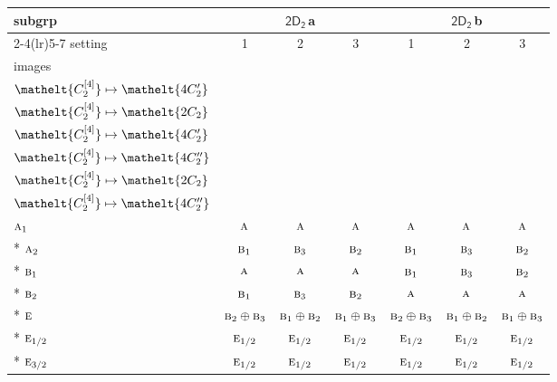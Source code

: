 \documentclass[10pt,a4paper]{article}
\numberwithin{equation}{section}
\newcommand{\eltfont}[1]{{\let\sigma\eltsigma\mathelt{#1}}}
\newcommand{\grp}[1]{\mathsf{#1}}
\newcommand{\irr}[1]{\text{\normalfont\scshape #1}}
\newcommand{\cls}[1]{\eltfont{#1}}
\newcommand{\clsletter}[1]{\,{\scriptsize\color{black!55}#1}}
\newcommand{\genidx}[2]{#1^{[\mathrm{#2}]}}
\begin{document}
{\small\begin{longtable}{@{}lcccccc@{}}\toprule
subgrp & \multicolumn{3}{c}{\href{2D2.pdf}{$\grp{2D_{2}}$}\clsletter{a}} & \multicolumn{3}{c}{\href{2D2.pdf}{$\grp{2D_{2}}$}\clsletter{b}}\\\cmidrule(lr){2-4}\cmidrule(lr){5-7}
setting & 1 & 2 & 3 & 1 & 2 & 3\\
images & {\scriptsize\begin{tabular}[t]{@{}c@{}}$\cls{\genidx{C_{2}}{2}} \mapsto \cls{2C_{2}}$\\$\cls{\genidx{C_{2}}{4}} \mapsto \cls{4C_{2}'}$\end{tabular}} & {\scriptsize\begin{tabular}[t]{@{}c@{}}$\cls{\genidx{C_{2}}{2}} \mapsto \cls{4C_{2}'}$\\$\cls{\genidx{C_{2}}{4}} \mapsto \cls{2C_{2}}$\end{tabular}} & {\scriptsize\begin{tabular}[t]{@{}c@{}}$\cls{\genidx{C_{2}}{2}} \mapsto \cls{4C_{2}'}$\\$\cls{\genidx{C_{2}}{4}} \mapsto \cls{4C_{2}'}$\end{tabular}} & {\scriptsize\begin{tabular}[t]{@{}c@{}}$\cls{\genidx{C_{2}}{2}} \mapsto \cls{2C_{2}}$\\$\cls{\genidx{C_{2}}{4}} \mapsto \cls{4C_{2}''}$\end{tabular}} & {\scriptsize\begin{tabular}[t]{@{}c@{}}$\cls{\genidx{C_{2}}{2}} \mapsto \cls{4C_{2}''}$\\$\cls{\genidx{C_{2}}{4}} \mapsto \cls{2C_{2}}$\end{tabular}} & {\scriptsize\begin{tabular}[t]{@{}c@{}}$\cls{\genidx{C_{2}}{2}} \mapsto \cls{4C_{2}''}$\\$\cls{\genidx{C_{2}}{4}} \mapsto \cls{4C_{2}''}$\end{tabular}}\\\midrule\endhead
\bottomrule\endfoot\endlastfoot
$\irr{a}_{1}$ & $\irr{a}$ & $\irr{a}$ & $\irr{a}$ & $\irr{a}$ & $\irr{a}$ & $\irr{a}$\\*
$\irr{a}_{2}$ & $\irr{b}_{1}$ & $\irr{b}_{3}$ & $\irr{b}_{2}$ & $\irr{b}_{1}$ & $\irr{b}_{3}$ & $\irr{b}_{2}$\\*
$\irr{b}_{1}$ & $\irr{a}$ & $\irr{a}$ & $\irr{a}$ & $\irr{b}_{1}$ & $\irr{b}_{3}$ & $\irr{b}_{2}$\\*
$\irr{b}_{2}$ & $\irr{b}_{1}$ & $\irr{b}_{3}$ & $\irr{b}_{2}$ & $\irr{a}$ & $\irr{a}$ & $\irr{a}$\\*
$\irr{e}$ & $\irr{b}_{2}\oplus \irr{b}_{3}$ & $\irr{b}_{1}\oplus \irr{b}_{2}$ & $\irr{b}_{1}\oplus \irr{b}_{3}$ & $\irr{b}_{2}\oplus \irr{b}_{3}$ & $\irr{b}_{1}\oplus \irr{b}_{2}$ & $\irr{b}_{1}\oplus \irr{b}_{3}$\\*
$\irr{e}_{1/2}$ & $\irr{e}_{1/2}$ & $\irr{e}_{1/2}$ & $\irr{e}_{1/2}$ & $\irr{e}_{1/2}$ & $\irr{e}_{1/2}$ & $\irr{e}_{1/2}$\\*
$\irr{e}_{3/2}$ & $\irr{e}_{1/2}$ & $\irr{e}_{1/2}$ & $\irr{e}_{1/2}$ & $\irr{e}_{1/2}$ & $\irr{e}_{1/2}$ & $\irr{e}_{1/2}$\\
\bottomrule\end{longtable}}
\end{document}
